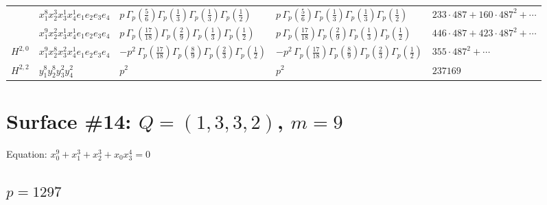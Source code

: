\documentclass[11pt]{article}
\begin{document}
\begin{table}[ht]
{\begin{tabular}{@{}lllll@{}}
 & $x_{1}^{8} x_{2}^{3} x_{3}^{1} x_{4}^{1}  e_{1} e_{2} e_{3} e_{4}$ & $p \, \Gamma_p \left( \frac{5}{6} \right) \Gamma_p \left( \frac{1}{3} \right) \Gamma_p \left( \frac{1}{3} \right) \Gamma_p \left( \frac{1}{2} \right)$ & $p \, \Gamma_p \left( \frac{5}{6} \right) \Gamma_p \left( \frac{1}{3} \right) \Gamma_p \left( \frac{1}{3} \right) \Gamma_p \left( \frac{1}{2} \right)$ & $233{\cdot}487{+}160{\cdot}487^{2}{+}\cdots$ \\
 & $x_{1}^{9} x_{2}^{2} x_{3}^{1} x_{4}^{1}  e_{1} e_{2} e_{3} e_{4}$ & $p \, \Gamma_p \left( \frac{17}{18} \right) \Gamma_p \left( \frac{2}{9} \right) \Gamma_p \left( \frac{1}{3} \right) \Gamma_p \left( \frac{1}{2} \right)$ & $p \, \Gamma_p \left( \frac{17}{18} \right) \Gamma_p \left( \frac{2}{9} \right) \Gamma_p \left( \frac{1}{3} \right) \Gamma_p \left( \frac{1}{2} \right)$ & $446{\cdot}487{+}423{\cdot}487^{2}{+}\cdots$ \\
\midrule
$H^{2,0}$ & $x_{1}^{9} x_{2}^{8} x_{3}^{2} x_{4}^{1}  e_{1} e_{2} e_{3} e_{4}$ & $- p^{2} \, \Gamma_p \left( \frac{17}{18} \right) \Gamma_p \left( \frac{8}{9} \right) \Gamma_p \left( \frac{2}{3} \right) \Gamma_p \left( \frac{1}{2} \right)$ & $- p^{2} \, \Gamma_p \left( \frac{17}{18} \right) \Gamma_p \left( \frac{8}{9} \right) \Gamma_p \left( \frac{2}{3} \right) \Gamma_p \left( \frac{1}{2} \right)$ & $355{\cdot}487^{2}{+}\cdots$ \\
\midrule
$H^{2,2}$ & $y_{1}^{8} y_{2}^{8} y_{3}^{2} y_{4}^{2}$ & $p^{2} \,$ & $p^{2} \,$ & $237169$ \\
\bottomrule
\end{tabular}
}
\renewcommand{\arraystretch}{1.0}
\end{table}

\newpage

\section*{Surface \#14: $Q=(1, 3, 3, 2)$, $m=9$}

Equation: $x_0^{9} + x_1^{3} + x_2^{3} + x_0 x_3^{4} = 0$

\subsection*{$p = 1297$}
\end{document}
